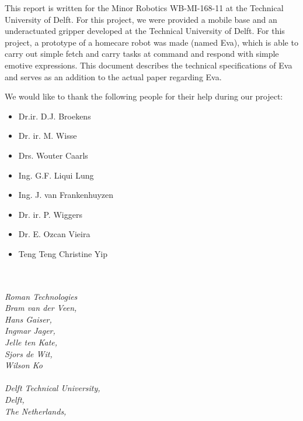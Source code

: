 \documentclass[technical_document.tex]{subfiles}
\begin{document}
This report is written for the Minor Robotics WB-MI-168-11 at the Technical University of Delft. For this project, we were provided a mobile base and an underactuated gripper developed at the Technical University of Delft. For this project, a prototype of a homecare robot was made (named Eva), which is able to carry out simple fetch and carry tasks at command and respond with simple emotive expressions. This document describes the technical specifications of Eva and serves as an addition to the actual paper regarding Eva.

We would like to thank the following people for their help during our project:
\\
\begin{itemize}
\item[] Dr.ir. D.J. Broekens 
\item[] Dr. ir. M. Wisse 
\item[] Drs. Wouter Caarls
\item[] Ing. G.F. Liqui Lung 
\item[] Ing. J. van Frankenhuyzen 
\item[] Dr. ir. P. Wiggers 
\item[] Dr. E. Ozcan Vieira
\item[] Teng Teng Christine Yip
\end{itemize}
 

\textit{
\\\\
Roman Technologies\\
Bram van der Veen,\\
Hans Gaiser,\\
Ingmar Jager,\\
Jelle ten Kate,\\  
Sjors de Wit,\\
Wilson Ko\\\\
Delft Technical University,\\
Delft,\\
The Netherlands,\\
}
\end{document}
